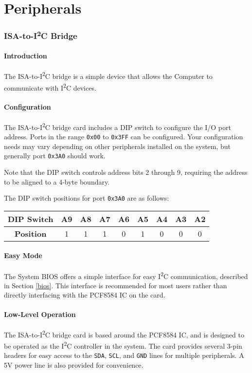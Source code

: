 \documentclass[twoside,10pt,letterpaper]{refart}
\newcommand{\itwoc}{I\textsuperscript{2}C}
\begin{document}
\part{Peripherals}

\section{ISA-to-\itwoc{} Bridge}

\subsection{Introduction}
The ISA-to-\itwoc{} bridge is a simple device that allows the  Computer to communicate
with \itwoc{} devices.

\subsection{Configuration}
The ISA-to-\itwoc{} bridge card includes a DIP switch to configure the I/O port address.
Ports in the range \texttt{0x00} to \texttt{0x3FF} can be configured. Your configuration needs
may vary depending on other peripherals installed on the system, but generally port \texttt{0x3A0}
should work.

Note that the DIP switch controls address bits 2 through 9, requiring the address to be aligned to
a 4-byte boundary.

The DIP switch positions for port \texttt{0x3A0} are as follows:

\begin{center}
    \begin{tabular}{ c|c|c|c|c|c|c|c|c }
        \textbf{DIP Switch} & A9 & A8 & A7 & A6 & A5 & A4 & A3 & A2 \\
        \hline
        \textbf{Position} & 1 & 1 & 1 & 0 & 1 & 0 & 0 & 0
    \end{tabular}
\end{center}

\subsection{Easy Mode}
The  System BIOS offers a simple interface for easy \itwoc{} communication, described in Section \ref{bios}.
This interface is recommended for most users rather than directly interfacing with the PCF8584 IC on the card.

\subsection{Low-Level Operation}
The ISA-to-\itwoc{} bridge card is based around the PCF8584 IC, and is designed to be operated as the \itwoc
controller in the system. The card provides several 3-pin headers for easy access to the \texttt{SDA}, \texttt{SCL},
and \texttt{GND} lines for multiple peripherals. A 5V power line is also provided for convenience.
\end{document}
